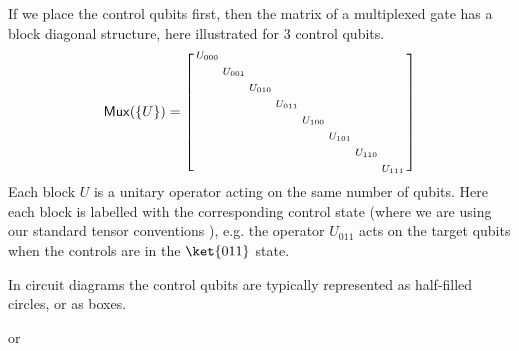If we place the control qubits first, then the matrix of a multiplexed gate has a block diagonal structure, here illustrated for 3 control qubits.
\[
{\sf{Mux}}(\{U\}) = 
\begin{bsmallmatrix}
    U_{000} \\[1ex]
    & U_{001} \\[1ex]
    && U_{010} \\[1ex]
    &&& U_{011}  \\[1ex]
    &&&& U_{100} \\[1ex]
    &&&&& U_{101} \\[1ex]
    &&&&&& U_{110} \\[1ex]
    &&&&&&& U_{111}     
\end{bsmallmatrix}
\]
Each block $U$ is a unitary operator acting on the same number of qubits. Here each block is labelled with the corresponding control state (where we are using our standard tensor conventions ), e.g. the operator $U_{011}$ acts on the target qubits when the controls are in the $\ket{011}$ state.



In circuit diagrams the control qubits are typically represented as half-filled circles, or as boxes. 
\begin{center}
or
\end{center}

